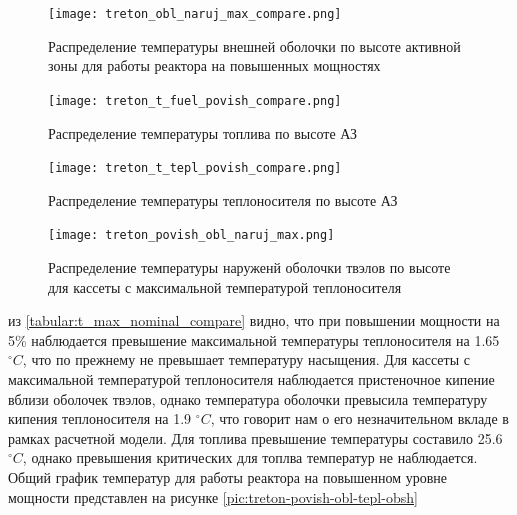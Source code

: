 \begin{figure}[H]
	\begin{center}
		\texttt{[image: treton\_obl\_naruj\_max\_compare.png]}
		\caption{Распределение температуры внешней оболочки по высоте активной зоны для работы реактора на повышенных мощностях }
		\label{pic:treton-obl-naruj-max-compare} %
	\end{center}
\end{figure}

\begin{figure}[H]
	\begin{center}
		\texttt{[image: treton\_t\_fuel\_povish\_compare.png]}
		\caption{Распределение температуры топлива по высоте АЗ}
		\label{pic:treton-t-fuel-povish-compare} %
	\end{center}
\end{figure}

\begin{figure}[H]
	\begin{center}
		\texttt{[image: treton\_t\_tepl\_povish\_compare.png]}
		\caption{Распределение температуры теплоносителя по высоте АЗ}
		\label{pic:treton-t-tepl-povish-compare} %
	\end{center}
\end{figure}

\begin{figure}[H]
	\begin{center}
		\texttt{[image: treton\_povish\_obl\_naruj\_max.png]}
		\caption{Распределение температуры наруженй оболочки твэлов по высоте для кассеты с максимальной температурой теплоносителя}
		\label{pic:treton-povish-obl-naruj-max} %
	\end{center}
\end{figure}

из \ref{tabular:t_max_nominal_compare} видно, что при повышении мощности на 5\% наблюдается превышение максимальной температуры теплоносителя на 1.65 $^\circ C$, что по прежнему не превышает температуру насыщения. Для кассеты с максимальной температурой теплоносителя наблюдается пристеночное кипение вблизи оболочек твэлов, однако температура оболочки превысила температуру кипения теплоносителя на 1.9 $^\circ C$, что говорит нам о его незначительном вкладе в рамках расчетной модели.
Для топлива превышение температуры составило 25.6 $^\circ C$, однако превышения критических для топлва температур не наблюдается. Общий график температур для работы реактора на повышенном уровне мощности представлен на рисунке \ref{pic:treton-povish-obl-tepl-obsh}

